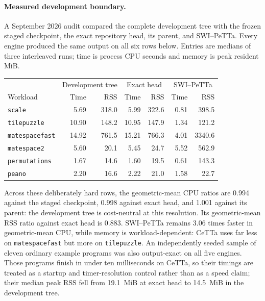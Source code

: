 \documentclass[11pt]{article}
\newcommand{\code}[1]{\texttt{#1}}
\newcommand{\CeTTa}{\textup{CeTTa}}
\begin{document}
\paragraph{Measured development boundary.}
A September 2026 audit compared the complete development tree with
the frozen staged checkpoint, the exact repository head, its parent, and
SWI--PeTTa.  Every engine produced the same output on all six rows below.
Entries are medians of three interleaved runs; time is process CPU seconds and
memory is peak resident MiB.

\begin{center}
\small
\begin{tabular}{@{}lrrrrrr@{}}
\toprule
& \multicolumn{2}{c}{Development tree}
& \multicolumn{2}{c}{Exact head}
& \multicolumn{2}{c}{SWI--PeTTa} \\
Workload & Time & RSS & Time & RSS & Time & RSS \\
\midrule
\code{scale}          & 5.69 & 318.0 & 5.99 & 322.6 & 0.81 & 398.5 \\
\code{tilepuzzle}     & 10.90 & 148.2 & 10.95 & 147.9 & 1.34 & 121.2 \\
\code{matespacefast} & 14.92 & 761.5 & 15.21 & 766.3 & 4.01 & 3340.6 \\
\code{matespace2}    & 5.60 & 20.1 & 5.45 & 24.7 & 5.52 & 562.9 \\
\code{permutations}  & 1.67 & 14.6 & 1.60 & 19.5 & 0.61 & 143.3 \\
\code{peano}         & 2.20 & 16.6 & 2.22 & 21.0 & 1.58 & 22.7 \\
\bottomrule
\end{tabular}
\normalsize
\end{center}

Across these deliberately hard rows, the geometric-mean CPU ratios are
0.994 against the staged checkpoint, 0.998 against exact head, and 1.001
against its parent: the development tree is cost-neutral at this resolution.
Its geometric-mean RSS ratio against exact head is 0.883.  SWI--PeTTa remains
3.06 times faster in geometric-mean CPU, while memory is workload-dependent:
\CeTTa{} uses far less on \code{matespacefast} but more on
\code{tilepuzzle}.  An independently seeded sample of eleven ordinary example
programs was also output-exact on all five engines.  Those programs finish in
under ten milliseconds on \CeTTa{}, so their timings are treated as a startup
and timer-resolution control rather than as a speed claim; their median peak
RSS fell from 19.1~MiB at exact head to 14.5~MiB in the development tree.
\end{document}
